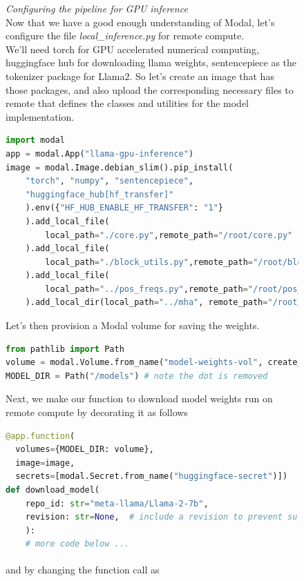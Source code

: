 \documentclass[12pt]{article}
\newcommand{\customtext}[3]{%
    \vspace{#2} %
    \fontsize{13}{8}\textcolor{#1}{\textit{#3}}%
}
\newcommand{\sidecite}[1]{\textsuperscript{\textcolor{blue}{\textbf{\scriptsize#1}}}}
\newcommand{\maincitecount}{\sidecite{\stepcounter{maincite}\themaincite}}
\begin{document}
\begin{figure}[!htb]
    \begin{minipage}[t]{0.65\textwidth}
    \raggedright
    \customtext{xtitle}{0em}{Configuring the pipeline for GPU inference}\\
Now that we have a good enough understanding of Modal, let's configure the file
{\it \small local\_inference.py} for remote compute.\\
We'll need torch for GPU accelerated numerical computing, huggingface hub for downloading 
llama weights, sentencepiece as the tokenizer package for Llama2. So let's create 
an image that has those packages, and also upload the corresponding necessary files to remote 
that defines the classes and utilities for the model implementation.

\begin{lstlisting}[language=python,style=python,basicstyle=\ttfamily\scriptsize]
import modal 
app = modal.App("llama-gpu-inference")
image = modal.Image.debian_slim().pip_install(
    "torch", "numpy", "sentencepiece",
    "huggingface_hub[hf_transfer]"
    ).env({"HF_HUB_ENABLE_HF_TRANSFER": "1"}
    ).add_local_file(
        local_path="./core.py",remote_path="/root/core.py"
    ).add_local_file(
        local_path="./block_utils.py",remote_path="/root/block_utils.py"
    ).add_local_file(
        local_path="../pos_freqs.py",remote_path="/root/pos_freqs.py"
    ).add_local_dir(local_path="../mha", remote_path="/root/mha")
\end{lstlisting}
Let's then provision a Modal volume for saving the weights. 
\begin{lstlisting}[language=python,style=python,basicstyle=\ttfamily\footnotesize]
from pathlib import Path
volume = modal.Volume.from_name("model-weights-vol", create_if_missing=True)
MODEL_DIR = Path("/models") # note the dot is removed
\end{lstlisting}
Next, we make our function to download model weights run on remote compute by decorating it as follows
\begin{lstlisting}[language=python,style=python,basicstyle=\ttfamily\footnotesize]
@app.function(
  volumes={MODEL_DIR: volume},
  image=image,
  secrets=[modal.Secret.from_name("huggingface-secret")])
def download_model(
    repo_id: str="meta-llama/Llama-2-7b",
    revision: str=None,  # include a revision to prevent surprises!
    ):
    # more code below ...
\end{lstlisting}
and by changing the function call as{\maincitecount} 
\begin{lstlisting}[language=python,style=python,basicstyle=\ttfamily\footnotesize]

\end{lstlisting}
\end{minipage}
\end{figure}
\end{document}

